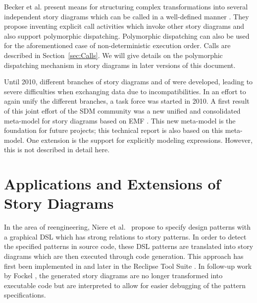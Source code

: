 Becker et al. present means for structuring complex transformations into several independent story diagrams which can be called in a well-defined manner \cite{BvDHR11}.
They propose inventing explicit call activities which invoke other story diagrams and also support polymorphic dispatching.
Polymorphic dispatching can also be used for the aforementioned case of non-deterministic execution order.
Calls are described in Section~\ref{sec:Calls}.
We will give details on the polymorphic dispatching mechanism in story diagrams in later versions of this document.

Until 2010, different branches of story diagrams and of \fuj were developed, leading to severe difficulties when exchanging data due to incompatibilities.
In an effort to again unify the different branches, a task force was started in 2010.
A first result of this joint effort of the SDM community was a new unified and consolidated meta-model for story diagrams based on EMF \cite{HRvD+11}.
This new meta-model is the foundation for future projects; this technical report is also based on this meta-model.
One extension is the support for explicitly modeling expressions.
However, this is not described in detail here.













\section{Applications and Extensions of Story Diagrams}
\label{sec:RW_Extensions}

In the area of reengineering, Niere et al.\ \cite{NSW+02} propose to specify design patterns with a graphical DSL which has strong relations to story patterns. In order to detect the specified patterns in source code, these DSL patterns are translated into story diagrams which are then executed through code generation. This approach has first been implemented in \fuj and later in the Reclipse Tool Suite \cite{DMT10}. In follow-up work by Fockel \cite{Foc10}, the generated story diagrams are no longer transformed into executable code but are interpreted to allow for easier debugging of the pattern specifications.


